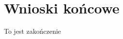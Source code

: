 \documentclass[document.tex]{subfiles}
\begin{document}
\chapter{Wnioski końcowe}
To jest zakończenie
\end{document}
